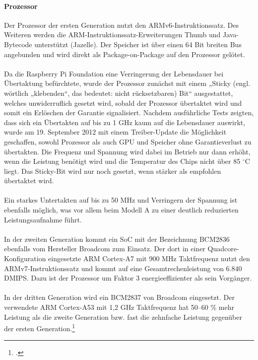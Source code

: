 \paragraph{Prozessor}
Der Prozessor der ersten Generation nutzt den ARMv6-Instruktionssatz. Des Weiteren werden die ARM-Instruktionssatz-Erweiterungen Thumb und Java-Bytecode unterstützt (Jazelle). Der Speicher ist über einen 64 Bit breiten Bus angebunden und wird direkt als Package-on-Package auf den Prozessor gelötet.\\
\\
Da die Raspberry Pi Foundation eine Verringerung der Lebensdauer bei Übertaktung befürchtete, wurde der Prozessor zunächst mit einem „Sticky (engl. wörtlich „klebenden“, das bedeutet: nicht rücksetzbaren) Bit“ ausgestattet, welches unwiderruflich gesetzt wird, sobald der Prozessor übertaktet wird und somit ein Erlöschen der Garantie signalisiert. Nachdem ausführliche Tests zeigten, dass sich ein Übertakten auf bis zu 1 GHz kaum auf die Lebensdauer auswirkt, wurde am 19. September 2012 mit einem Treiber-Update die Möglichkeit geschaffen, sowohl Prozessor als auch GPU und Speicher ohne Garantieverlust zu übertakten. Die Frequenz und Spannung wird dabei im Betrieb nur dann erhöht, wenn die Leistung benötigt wird und die Temperatur des Chips nicht über 85 $^{\circ}$C liegt. Das Sticky-Bit wird nur noch gesetzt, wenn stärker als empfohlen übertaktet wird.\\
\\
Ein starkes Untertakten auf bis zu 50 MHz und Verringern der Spannung ist ebenfalls möglich, was vor allem beim Modell A zu einer deutlich reduzierten Leistungsaufnahme führt.\\
\\
In der zweiten Generation kommt ein SoC mit der Bezeichnung BCM2836 ebenfalls vom Hersteller Broadcom zum Einsatz. Der dort in einer Quadcore-Konfiguration eingesetzte ARM Cortex-A7 mit 900 MHz Taktfrequenz nutzt den ARMv7-Instruktionssatz und kommt auf eine Gesamtrechenleistung von 6.840 DMIPS. Dazu ist der Prozessor um Faktor 3 energieeffizienter als sein Vorgänger.\\
\\
In der dritten Generation wird ein BCM2837 von Broadcom eingesetzt. Der verwendete ARM Cortex-A53 mit 1,2 GHz Taktfrequenz hat 50–60 \% mehr Leistung als die zweite Generation bzw. fast die zehnfache Leistung gegenüber der ersten Generation.\footcite{shit_raspi}

